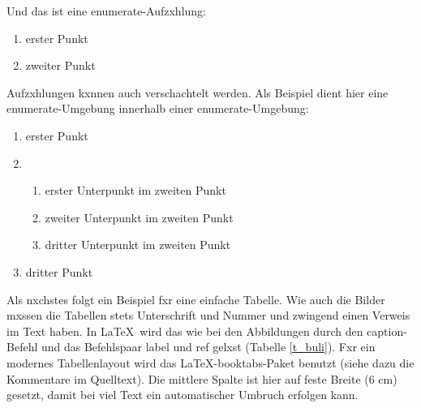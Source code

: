             Und das ist eine enumerate-Aufzxhlung:

            \begin{enumerate}\setlength{\itemsep}{0ex}
                \item erster Punkt
                \item zweiter Punkt
            \end{enumerate}

            Aufzxhlungen kxnnen auch verschachtelt werden. Als Beispiel dient hier eine enumerate-Umgebung innerhalb einer enumerate-Umgebung:

            \begin{enumerate}\setlength{\itemsep}{0ex}
                \item erster Punkt
                \item 
                    \begin{enumerate}\setlength{\itemsep}{-0.5ex}
                    \item erster Unterpunkt im zweiten Punkt
                    \item zweiter Unterpunkt im zweiten Punkt
                    \item dritter Unterpunkt im zweiten Punkt
                    \end{enumerate}
                \item dritter Punkt
            \end{enumerate}

            Als nxchstes folgt ein Beispiel fxr eine einfache Tabelle. Wie auch die Bilder mxssen die Tabellen stets Unterschrift und Nummer und zwingend einen Verweis im Text haben. In \LaTeX\ wird das wie bei den Abbildungen durch den caption-Befehl und das Befehlspaar label und ref gelxst (Tabelle \ref{t_buli}). Fxr ein modernes Tabellenlayout wird das \LaTeX-booktabs-Paket benutzt (siehe dazu die Kommentare im Quelltext). Die mittlere Spalte ist hier auf feste Breite (6 cm) gesetzt, damit bei viel Text ein automatischer Umbruch erfolgen kann.

